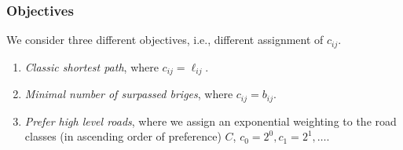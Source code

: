 \documentclass{beamer}   %
\theoremstyle{break}
\begin{document}
  \begin{frame}
    \frametitle{Objectives}
    We consider three different objectives, i.e., different assignment of $c_{ij}$.
    \begin{enumerate}
      \item \emph{Classic shortest path}, where $c_{ij}=\ell_{ij}$. \label{obj_short}
      \item \emph{Minimal number of surpassed briges}, where  $c_{ij}=b_{ij}$.  \label{obj_minBridge}
      \item \emph{Prefer high level roads}, where we assign an exponential weighting to the road classes (in ascending order of preference) $C$, $c_0=2^0,c_1=2^1, \ldots$.  \label{obj_highLevelRoad}
    \end{enumerate}
  \end{frame}
  \begin{frame}

    \begin{figure}[!ht]
      \centering
      \scalebox{0.7}{
      
      }
    \end{figure}
  \end{frame}
\end{document}
